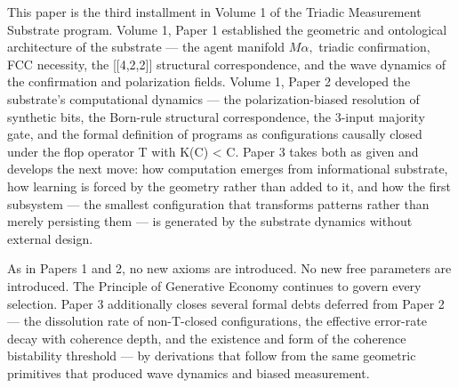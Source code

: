 \documentclass[11pt,oneside]{report}
\theoremstyle{definition}
\theoremstyle{remark}
\begin{document}
This paper is the third installment in Volume 1 of the Triadic
Measurement Substrate program. Volume 1, Paper 1 established the
geometric and ontological architecture of the substrate --- the agent
manifold \ensuremath{M\alpha ,} triadic confirmation, FCC necessity, the [[4,2,2]]
structural correspondence, and the wave dynamics of the confirmation and
polarization fields. Volume 1, Paper 2 developed the substrate's
computational dynamics --- the polarization-biased resolution of
synthetic bits, the Born-rule structural correspondence, the 3-input
majority gate, and the formal definition of programs as configurations
causally closed under the flop operator T with K(C) \textless{}
\textbar C\textbar. Paper 3 takes both as given and develops the next
move: how computation emerges from informational substrate, how learning
is forced by the geometry rather than added to it, and how the first
subsystem --- the smallest configuration that transforms patterns rather
than merely persisting them --- is generated by the substrate dynamics
without external design.

As in Papers 1 and 2, no new axioms are introduced. No new free
parameters are introduced. The Principle of Generative Economy continues
to govern every selection. Paper 3 additionally closes several formal
debts deferred from Paper 2 --- the dissolution rate of non-T-closed
configurations, the effective error-rate decay with coherence depth, and
the existence and form of the coherence bistability threshold --- by
derivations that follow from the same geometric primitives that produced
wave dynamics and biased measurement.
\end{document}
